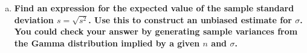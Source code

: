 \documentclass[11pt]{article}
\newenvironment{solution}
  {\renewcommand\qedsymbol{$\blacksquare$}\begin{proof}[Solution]}
  {\end{proof}}
\begin{document}
\begin{enumerate}
\begin{enumerate}[a)]
\begin{solution}
        Since $s^2$ is an unbiased estimate, its mean square error is equal to its variance:
        \[
            MSE(s^2) = \mathrm{Var} \left[s^2 \right] = \frac{2\sigma^4}{n-1}.
        \]
        On the other hand, 
        \begin{align*}
            MSE(\hat{\sigma}^2) &= \mathrm{Var} \left[\hat{\sigma}^2 \right] + (\mathbb{E}\left[\hat{\sigma}^2 \right] - \sigma^2)^2 \\
            &= \left( \frac{2\sigma^4 (n-1)}{n^2} \right) + \left( \frac{n-1}{n}\sigma^2 - \sigma^2 \right)^2 \\
            &= \frac{2\sigma^4 (n-1)}{n^2} + \frac{\sigma^4}{n^2} \\
            &= \frac{(2n-1) \sigma^4}{n^2}.
        \end{align*}
        Note that by direct comparison, since $\frac{2n-1}{n^2} < \frac{2}{n-1}$, it follows that $MSE(\hat{\sigma}^2) < MSE(s^2)$, as desired.
        \end{solution}

        \item \textbf{Find an expression for the expected value of the sample standard deviation $s = \sqrt{s^2}$. Use this to construct
        an unbiased estimate for $\sigma$. You could check your answer by generating sample variances from the Gamma distribution implied by a given $n$ and $\sigma$.}
        

\end{enumerate}
\end{enumerate}
\end{document}
